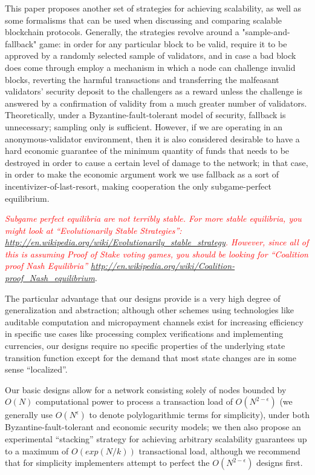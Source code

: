 \documentclass[11pt,a4paper]{report}
\newcommand{\comment}[1]{\textcolor{red}{\textit{#1}}}
\theoremstyle{plain}
\theoremstyle{definition}
\theoremstyle{remark}
\begin{document}
This paper proposes another set of strategies for achieving scalability, as well as some formalisms that can be used when discussing and comparing scalable blockchain protocols. Generally, the strategies revolve around a "sample-and-fallback" game: in order for any particular block to be valid, require it to be approved by a randomly selected sample of validators, and in case a bad block does come through employ a mechanism in which a node can challenge invalid blocks, reverting the harmful transactions and transferring the malfeasant validators' security deposit to the challengers as a reward unless the challenge is answered by a confirmation of validity from a much greater number of validators. Theoretically, under a Byzantine-fault-tolerant model of security, fallback is unnecessary; sampling only is sufficient. However, if we are operating in an anonymous-validator environment, then it is also considered desirable to have a hard economic guarantee of the minimum quantity of funds that needs to be destroyed in order to cause a certain level of damage to the network; in that case, in order to make the economic argument work we use fallback as a sort of incentivizer-of-last-resort, making cooperation the only subgame-perfect equilibrium.

\comment{Subgame perfect equilibria are not terribly stable.  For more stable equilibria, you might look at ``Evolutionarily Stable Strategies'': \url{http://en.wikipedia.org/wiki/Evolutionarily_stable_strategy}.  However, since all of this is assuming Proof of Stake voting games, you should be looking for ``Coalition proof Nash Equilibria'' \url{http://en.wikipedia.org/wiki/Coalition-proof_Nash_equilibrium}}.

The particular advantage that our designs provide is a very high degree of generalization and abstraction; although other schemes using technologies like auditable computation\citep{buterin_scalability_2014} and micropayment channels\citep{poon_bitcoin_2015} exist for increasing efficiency in specific use cases like processing complex verifications and implementing currencies, our designs require no specific properties of the underlying state transition function except for the demand that most state changes are in some sense ``localized''.

Our basic designs allow for a network consisting solely of nodes bounded by $O(N)$ computational power to process a transaction load of $O(N^{2-\epsilon})$ (we generally use $O(N^\epsilon)$ to denote polylogarithmic terms for simplicity), under both Byzantine-fault-tolerant and economic security models; we then also propose an experimental ``stacking'' strategy for achieving arbitrary scalability guarantees up to a maximum of $O(exp(N/k))$ transactional load, although we recommend that for simplicity implementers attempt to perfect the $O(N^{2-\epsilon})$ designs first.
\end{document}

